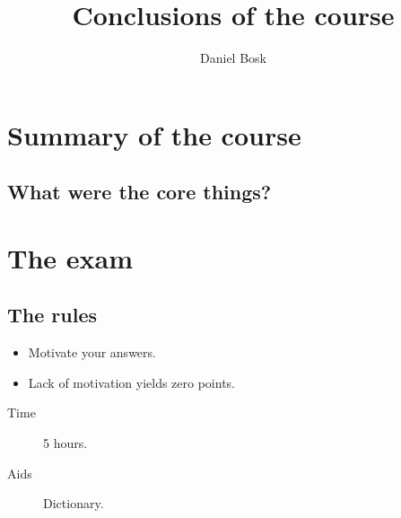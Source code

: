 \title{%
  Conclusions of the course
}
\author{Daniel Bosk}


\mode*

\begin{abstract}
  
\end{abstract}


\section{Summary of the course}

\subsection{What were the core things?}

\begin{frame}
\end{frame}


\section{The exam}

\subsection{The rules}

\begin{frame}
  \begin{itemize}
    \item Motivate your answers.
    \item Lack of motivation yields zero points.
  \end{itemize}
\end{frame}

\begin{frame}
  \begin{description}
    \item[Time] 5 hours.
    \item[Aids] Dictionary.
  \end{description}
\end{frame}

